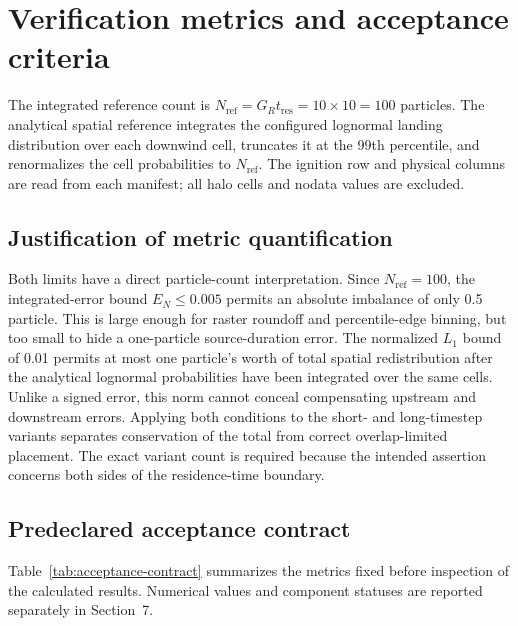 \section{Verification metrics and acceptance criteria}

The integrated reference count is
\(N_{\mathrm{ref}}=G_Rt_{\mathrm{res}}=10\times10=100\) particles. The analytical
spatial reference integrates the configured lognormal landing distribution over
each downwind cell, truncates it at the 99th percentile, and renormalizes the
cell probabilities to \(N_{\mathrm{ref}}\). The ignition row and physical columns
are read from each manifest; all halo cells and nodata values are excluded.

\subsection{Justification of metric quantification}

Both limits have a direct particle-count interpretation.  Since
\(N_{\mathrm{ref}}=100\), the integrated-error bound \(E_N\le0.005\) permits an
absolute imbalance of only 0.5 particle.  This is large enough for raster
roundoff and percentile-edge binning, but too small to hide a one-particle
source-duration error.  The normalized \(L_1\) bound of 0.01 permits at most
one particle's worth of total spatial redistribution after the analytical
lognormal probabilities have been integrated over the same cells.  Unlike a
signed error, this norm cannot conceal compensating upstream and downstream
errors.  Applying both conditions to the short- and long-timestep variants
separates conservation of the total from correct overlap-limited placement.
The exact variant count is required because the intended assertion concerns
both sides of the residence-time boundary.

\subsection{Predeclared acceptance contract}

Table~\ref{tab:acceptance-contract} summarizes the metrics fixed before
inspection of the calculated results. Numerical values and component statuses
are reported separately in Section~7.

